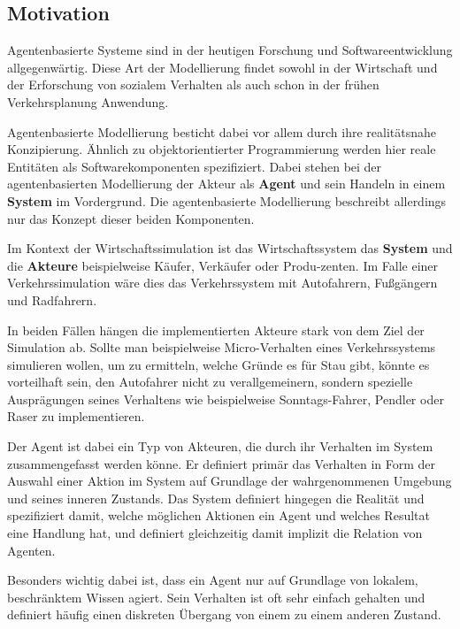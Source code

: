 \subsection{Motivation}

Agentenbasierte Systeme sind in der heutigen Forschung und Softwareentwicklung allgegenwärtig.
Diese Art der Modellierung findet sowohl in der Wirtschaft\autocite{Levy2009} und der Erforschung von sozialem Verhalten\autocite{fang2016} als auch schon in der frühen Verkehrsplanung\autocite{wiedermann1974} Anwendung.

Agentenbasierte Modellierung besticht dabei vor allem durch ihre realitätsnahe Konzipierung.
Ähnlich zu objektorientierter Programmierung werden hier reale Entitäten als Softwarekomponenten spezifiziert.
Dabei stehen bei der agentenbasierten Modellierung der Akteur als \textbf{Agent} und sein Handeln in einem \textbf{System} im Vordergrund.
Die agentenbasierte Modellierung beschreibt allerdings nur das Konzept dieser beiden Komponenten.

Im Kontext der Wirtschaftssimulation ist das Wirtschaftssystem das \textbf{System} und die \textbf{Akteure} beispielweise Käufer, Verkäufer oder Produ-\linebreak zenten\autocite{agenteco2015}.
Im Falle einer Verkehrssimulation wäre dies das Verkehrssystem mit Autofahrern, Fußgängern und Radfahrern\autocite{fujii2017}.

In beiden Fällen hängen die implementierten Akteure stark von dem Ziel der Simulation ab.
Sollte man beispielweise Micro-Verhalten eines Verkehrssystems simulieren wollen, um zu ermitteln, welche Gründe es für Stau gibt, könnte es vorteilhaft sein, den Autofahrer nicht zu verallgemeinern, sondern spezielle Ausprägungen seines Verhaltens wie beispielweise Sonntags-Fahrer, Pendler oder Raser zu implementieren.

Der Agent ist dabei ein Typ von Akteuren, die durch ihr Verhalten im System zusammengefasst werden könne.
Er definiert primär das Verhalten in Form der Auswahl einer Aktion im System auf Grundlage der wahrgenommenen Umgebung und seines inneren Zustands.
Das System definiert hingegen die Realität und spezifiziert damit, welche möglichen Aktionen ein Agent und welches Resultat eine Handlung hat, und definiert gleichzeitig damit implizit die Relation von Agenten\autocite{salamon2011}.

Besonders wichtig dabei ist, dass ein Agent nur auf Grundlage von lokalem, beschränktem Wissen agiert.
Sein Verhalten ist oft sehr einfach gehalten und definiert häufig einen diskreten Übergang von einem zu einem anderen Zustand.\autocite{salamon2011}

